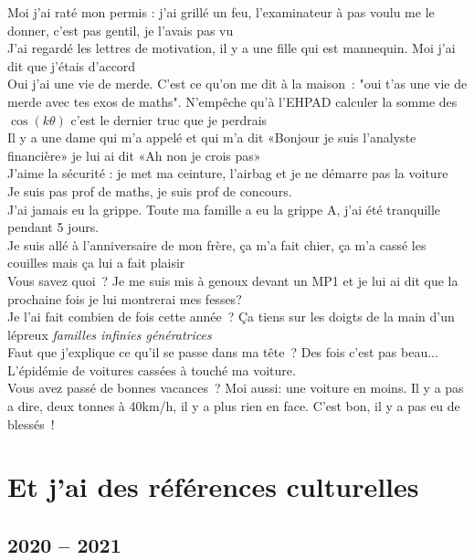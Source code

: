\documentclass[french, a4paper, openany]{book}
\begin{document}
	\noindent \og Moi j'ai raté mon permis : j'ai grillé un feu, l'examinateur à pas voulu me le donner, c'est pas gentil, je l'avais pas vu \fg \\
	\og J'ai regardé les lettres de motivation, il y a une fille qui est mannequin. Moi j'ai dit que j'étais d'accord \fg \\
	\og Oui j'ai une vie de merde. C'est ce qu'on me dit à la maison~: "oui t'as une vie de merde avec tes exos de maths". N'empêche qu'à l'EHPAD calculer la somme des $\cos(k \theta)$ c'est le dernier truc que je perdrais \fg \\
	\og Il y a une dame qui m'a appelé et qui m'a dit «Bonjour je suis l'analyste financière» je lui ai dit «Ah non je crois pas» \fg \\
	\og J'aime la sécurité : je met ma ceinture, l'airbag et je ne démarre pas la voiture \fg \\
	\og Je suis pas prof de maths, je suis prof de concours. \fg \\
	\og J'ai jamais eu la grippe. Toute ma famille a eu la grippe A, j'ai été tranquille pendant 5 jours. \fg \\
	\og Je suis allé à l'anniversaire de mon frère, ça m'a fait chier, ça m'a cassé les couilles mais ça lui a fait plaisir \fg \\
	\og Vous savez quoi~? Je me suis mis à genoux devant un MP1 et je lui ai dit que la prochaine fois je lui montrerai mes fesses? \fg \\
	\og Je l'ai fait combien de fois cette année~? Ça tiens sur les doigts de la main d'un lépreux \fg \emph{familles infinies génératrices} \\
	\og Faut que j'explique ce qu'il se passe dans ma tête~? Des fois c'est pas beau... \fg \\
	\og L'épidémie de voitures cassées à touché ma voiture. \fg \\
	\og Vous avez passé de bonnes vacances~? Moi aussi: une voiture en moins. Il y a pas a dire, deux tonnes à 40km/h, il y a plus rien en face. C'est bon, il y a pas eu de blessés~! \fg \\

	
\section*{Et j'ai des références culturelles}

	\subsection*{2020 -- 2021}
\end{document}

